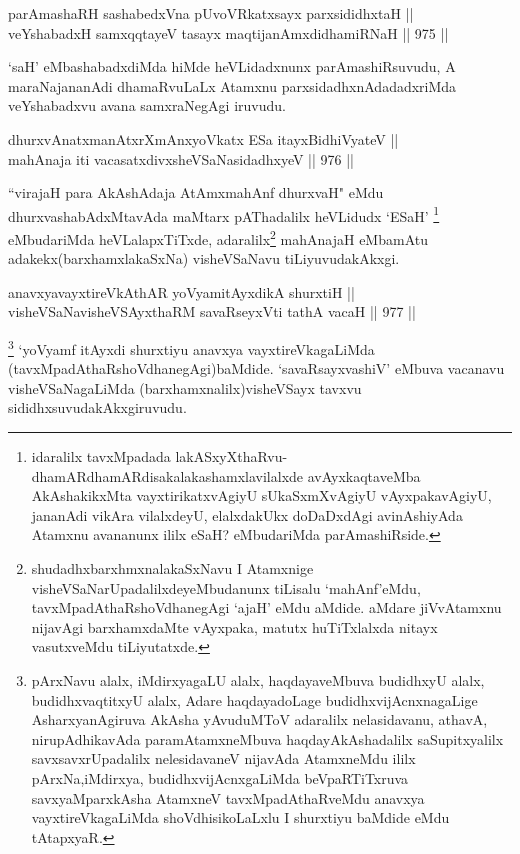 
\begin{shl}
parAmashaRH sashabedxVna pUvoVRkatxsayx parxsididhxtaH || \\
veYshabadxH samxqqtayeV tasayx maqtijanAmxdidhamiRNaH \hfill || 975 ||  
\end{shl}

\begin{artha}
`saH' eMbashabadxdiMda hiMde heVLidadxnunx parAmashiRsuvudu, A maraNajananAdi dhamaRvuLaLx Atamxnu parxsidadhxnAdadadxriMda veYshabadxvu avana samxraNegAgi iruvudu.
\end{artha}


\begin{shl}
dhurxvAnatxmanAtxrXmAnxyoVkatx ESa itayxBidhiVyateV || \\
mahAnaja iti vacasatxdivxsheVSaNasidadhxyeV \hfill || 976 ||  
\end{shl}

\begin{artha}
``virajaH para AkAshAdaja AtAmxmahAnf dhurxvaH" eMdu dhurxvashabAdxMtavAda maMtarx pAThadalilx heVLidudx `ESaH' \footnote{idaralilx tavxMpadada lakASxyXthaRvu-dhamARdhamARdisakalakashamxlavilalxde avAyxkaqtaveMba AkAshakikxMta vayxtirikatxvAgiyU sUkaSxmXvAgiyU vAyxpakavAgiyU, jananAdi vikAra vilalxdeyU, elalxdakUkx doDaDxdAgi avinAshiyAda Atamxnu avananunx ililx eSaH? eMbudariMda parAmashiRside.} eMbudariMda heVLalapxTiTxde, adaralilx\footnote{shudadhxbarxhmxnalakaSxNavu I Atamxnige visheVSaNarUpadalilxdeyeMbudanunx tiLisalu `mahAnf'eMdu, tavxMpadAthaRshoVdhanegAgi `ajaH' eMdu aMdide. aMdare jiVvAtamxnu nijavAgi barxhamxdaMte vAyxpaka, matutx huTiTxlalxda nitayx vasutxveMdu tiLiyutatxde.} mahAnajaH eMbamAtu adakekx(barxhamxlakaSxNa) visheVSaNavu tiLiyuvudakAkxgi.
\end{artha}


\begin{shl}
anavxyavayxtireVkAthAR yoV\s yamitAyxdikA shurxtiH || \\
visheVSaNavisheVSAyxthaRM savaRseyxVti tathA vacaH \hfill || 977 ||  
\end{shl}

\begin{artha}
\footnote{pArxNavu alalx, iMdirxyagaLU alalx, haqdayaveMbuva budidhxyU alalx, budidhxvaqtitxyU alalx, Adare haqdayadoLage budidhxvijAcnxnagaLige AsharxyanAgiruva AkAsha yAvuduMToV adaralilx nelasidavanu, athavA, nirupAdhikavAda paramAtamxneMbuva haqdayAkAshadalilx saSupitxyalilx savxsavxrUpadalilx nelesidavaneV nijavAda AtamxneMdu ililx pArxNa,iMdirxya, budidhxvijAcnxgaLiMda beVpaRTiTxruva savxyaMparxkAsha AtamxneV tavxMpadAthaRveMdu anavxya vayxtireVkagaLiMda shoVdhisikoLaLxlu I shurxtiyu baMdide eMdu tAtapxyaR.} `yoV\s yamf  itAyxdi shurxtiyu anavxya vayxtireVkagaLiMda (tavxMpadAthaRshoVdhanegAgi)baMdide. `savaRsayxvashiV' eMbuva vacanavu visheVSaNagaLiMda (barxhamxnalilx)visheVSayx tavxvu sididhxsuvudakAkxgiruvudu.
\end{artha}

